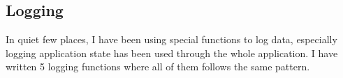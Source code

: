 \subsection{Logging}
In quiet few places, I have been using special functions to log data, especially logging application state has been used through the whole application.
I have written 5 logging functions where all of them follows the same pattern.
\begin{figure}[h]
    \centering
    \renewcommand{\thesubfigure}{}%
    \tightsubcaptions %
    \setlength{\subfloatlabelskip}{0pt}%
\end{figure}
\begin{figure}[h]\ContinuedFloat
    \centering
    \renewcommand{\thesubfigure}{}%
    \tightsubcaptions %
    \setlength{\subfloatlabelskip}{0pt}%
\end{figure}
